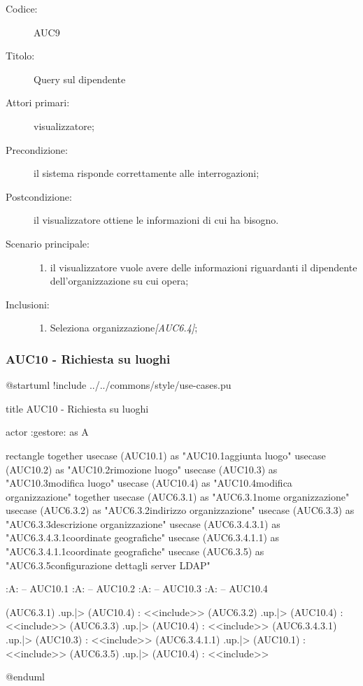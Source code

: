 \documentclass[casi-duso]{subfiles}
\begin{document}
\begin{description}
  \item[Codice:] AUC9
  \item[Titolo:] Query sul dipendente
  \item[Attori primari:] visualizzatore;
  \item[Precondizione:] il sistema risponde correttamente alle interrogazioni;
  \item[Postcondizione:] il visualizzatore ottiene le informazioni di cui ha bisogno.
  \item[Scenario principale:]
  \begin{enumerate}
    \item il visualizzatore vuole avere delle informazioni riguardanti il dipendente dell'organizzazione su cui opera;
  \end{enumerate}
  \item[Inclusioni:]
  \begin{enumerate}
    \item Seleziona organizzazione\emph{[AUC6.4]};
  \end{enumerate}
\end{description}

\subsubsection{AUC10 - Richiesta su luoghi}%
\label{subsub:AUC10}

\begin{plantuml}
@startuml 
!include ../../commons/style/use-cases.pu

title AUC10 - Richiesta su luoghi

actor :gestore: as A

rectangle {
  together {
    usecase (AUC10.1) as "AUC10.1\nRichiesta aggiunta luogo"
    usecase (AUC10.2) as "AUC10.2\nRichiesta rimozione luogo"
    usecase (AUC10.3) as "AUC10.3\nRichiesta modifica luogo"
    usecase (AUC10.4) as "AUC10.4\nRichiesta modifica organizzazione"
  }
  together {
    usecase (AUC6.3.1) as "AUC6.3.1\nModifica nome organizzazione"
    usecase (AUC6.3.2) as "AUC6.3.2\nModifica indirizzo organizzazione"
    usecase (AUC6.3.3) as "AUC6.3.3\nModifica descrizione organizzazione"
    usecase (AUC6.3.4.3.1) as "AUC6.3.4.3.1\nModifica coordinate geografiche"
    usecase (AUC6.3.4.1.1) as "AUC6.3.4.1.1\nInserisci coordinate geografiche"
    usecase (AUC6.3.5) as "AUC6.3.5\nModifica configurazione dettagli server LDAP"
  }
}

:A: -- AUC10.1
:A: -- AUC10.2
:A: -- AUC10.3
:A: -- AUC10.4


(AUC6.3.1) .up.|> (AUC10.4) : <<include>>
(AUC6.3.2) .up.|> (AUC10.4) : <<include>>
(AUC6.3.3) .up.|> (AUC10.4) : <<include>>
(AUC6.3.4.3.1) .up.|> (AUC10.3) : <<include>>
(AUC6.3.4.1.1) .up.|> (AUC10.1) : <<include>>
(AUC6.3.5) .up.|> (AUC10.4) : <<include>>

@enduml
\end{plantuml}
\end{document}
